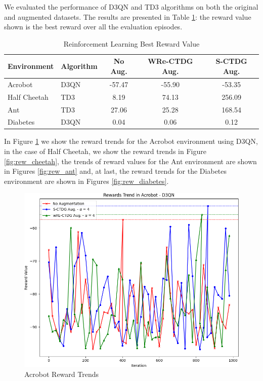 We evaluated the performance of D3QN and TD3 algorithms on both the
original and augmented datasets. The results are presented
in Table \ref{tab:rl_reward}: the reward value shown is the best reward
over all the evaluation episodes.

\begin{table}[H]
    \centering
    \begin{tabular}{@{}llccc@{}}
        \toprule
        \textbf{Environment} & \textbf{Algorithm} & \textbf{No Aug.} & \textbf{WRe-CTDG Aug.} & \textbf{S-CTDG Aug.} \\ \midrule
        Acrobot              & D3QN               & -57.47           & -55.90                 & -53.35               \\
        Half Cheetah         & TD3                & 8.19             & 74.13                  & 256.09                \\
        Ant                  & TD3                & 27.06            & 25.28                  & 168.54                 \\
        Diabetes             & D3QN               & 0.04             & 0.06                   & 0.12                   \\ \bottomrule
    \end{tabular}
    \caption{Reinforcement Learning Best Reward Value}
    \label{tab:rl_reward}
\end{table}

In Figure \ref{fig:rew_acrobot} we show the reward trends for the
Acrobot environment using D3QN,
in the case of Half Cheetah, we show the reward trends in
Figure \ref{fig:rew_cheetah},
the trends of reward values for the Ant environment
are shown in Figures \ref{fig:rew_ant} and,
at last, the reward trends for the Diabetes environment are shown in
Figures \ref{fig:rew_diabetes}.

\begin{figure}[H]
    \centering
    \includegraphics[width=.8\textwidth]{figures/ch5/rew_acrobot.png}
    \caption{Acrobot Reward Trends}
    \label{fig:rew_acrobot}
\end{figure}

